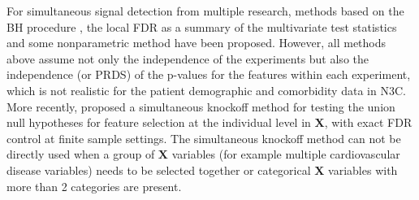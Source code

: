 \documentclass[11pt]{article}
\theoremstyle{plain}
\theoremstyle{definition}
\theoremstyle{remark}
\newcommand{\X}{\mathbf{X}}
\newcommand{\0}{\mathbf{0}}
\begin{document}

For simultaneous signal detection from multiple research, methods based on the BH procedure \citep{heller2014, bogomolov2013, bogomolov2018}, the local FDR as a summary of the multivariate test statistics \citep{chi2008, heller2014b} and some nonparametric method \citep{zhao2020} have been proposed. However, all methods above assume not only the independence of the experiments but also the independence (or PRDS) of the p-values for the features within each experiment, which is not realistic for the patient demographic and comorbidity data in N3C. More recently, \citet{dai2021multiple} proposed a simultaneous knockoff method for testing the union null hypotheses for feature selection at the individual level in $\X$, with exact FDR control at finite sample settings. The simultaneous knockoff method can not be directly used when a group of $\X$ variables (for example multiple cardiovascular disease variables) needs to be selected together or categorical $\X$ variables with more than 2 categories are present.


\end{document}
